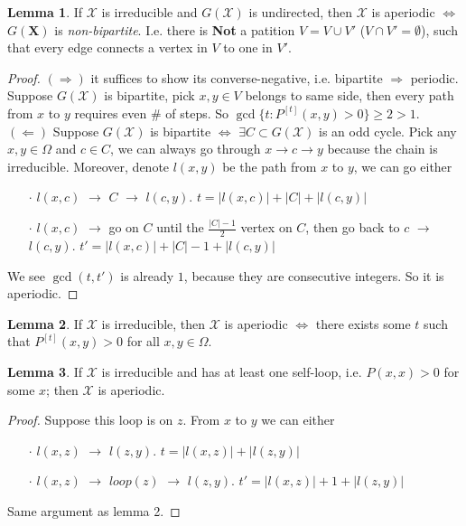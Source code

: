 \documentclass[a4paper, 11pt]{article}
\theoremstyle{definition}
\newtheorem{lemma}{Lemma}
\begin{document}
\begin{lemma} If $\mathcal{X}$ is irreducible and $G(\mathcal{X})$ is undirected, then $\mathcal{X}$ is aperiodic $\iff$ $G(\mathbf{X})$ is \textit{non-bipartite}. I.e. there is \textbf{Not} a patition $V=V\cup V'$ ($V\cap V' =\emptyset$), such that every edge connects a vertex in $V$ to one in $V'$.
\end{lemma}
\begin{proof} $(\Rightarrow)$ it suffices to show its converse-negative, i.e. bipartite $\Rightarrow$ periodic. Suppose $G(\mathcal{X})$ is bipartite, pick $x,y\in V$ belongs to same side, then every path from $x$ to $y$ requires even \# of steps. So $\gcd\{t: P^{[t]}(x,y)>0\}\geq 2 >1$. \\
$(\Leftarrow)$ Suppose $G(\mathcal{X})$ is bipartite $\iff$ $\exists C\subset G(\mathcal{X})$ is an odd cycle. Pick any $x,y\in \Omega$ and $c\in C$, we can always go through $x\to c\to y$ because the chain is irreducible. Moreover, denote $l(x,y)$ be the path from $x$ to $y$, we can go either
\begin{itemize}
	\item[$\cdot$] $l(x,c)$ $\to$ $C$ $\to$ $l(c,y)$. $t=|l(x,c)|+|C|+|l(c,y)|$
	\item[$\cdot$] $l(x,c)$ $\to$ go on $C$ until the $\frac{|C|-1}{2}$ vertex on $C$, then go back to $c$ $\to$ $l(c,y)$. $t'=|l(x,c)|+|C|-1+|l(c,y)|$
\end{itemize}
We see $\gcd(t,t')$ is already $1$, because they are consecutive integers. So it is aperiodic.
\end{proof}

\begin{lemma} If $\mathcal{X}$ is irreducible, then $\mathcal{X}$ is aperiodic $\iff$ there exists some $t$ such that $P^{[t]}(x,y)>0$ for all $x,y\in \Omega$.
\end{lemma}

\begin{lemma} If $\mathcal{X}$ is irreducible and has at least one self-loop, i.e. $P(x,x)>0$ for some $x$; then $\mathcal{X}$ is aperiodic.
\end{lemma}
\begin{proof} Suppose this loop is on $z$. From $x$ to $y$ we can either
\begin{itemize}
	\item[$\cdot$] $l(x,z)$ $\to$ $l(z,y)$. $t=|l(x,z)|+|l(z,y)|$
	\item[$\cdot$] $l(x,z)$ $\to$ $loop(z)$ $\to$ $l(z,y)$. $t'=|l(x,z)|+1+|l(z,y)|$
\end{itemize}
Same argument as lemma 2.
\end{proof}
\end{document}
